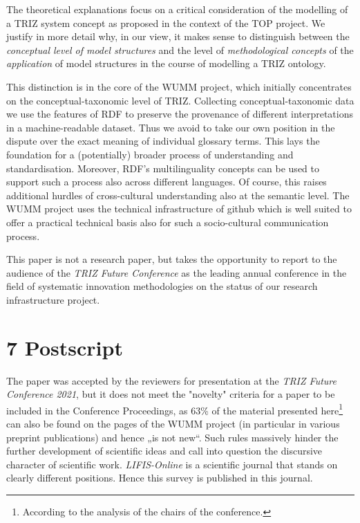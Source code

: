 \documentclass[12pt,a4paper]{article}
\begin{document}
The theoretical explanations focus on a critical consideration of the
modelling of a TRIZ system concept as proposed in the context of the TOP
project. We justify in more detail why, in our view, it makes sense to
distinguish between the \emph{conceptual level of model structures} and the
level of \emph{methodological concepts} of the \emph{application} of model
structures in the course of modelling a TRIZ ontology.

This distinction is in the core of the WUMM project, which initially
concentrates on the conceptual-taxonomic level of TRIZ. Collecting
conceptual-taxonomic data we use the features of RDF to preserve the
provenance of different interpretations in a machine-readable dataset. Thus we
avoid to take our own position in the dispute over the exact meaning of
individual glossary terms. This lays the foundation for a (potentially)
broader process of understanding and standardisation. Moreover, RDF's
multilinguality concepts can be used to support such a process also across
different languages. Of course, this raises additional hurdles of
cross-cultural understanding also at the semantic level. The WUMM project uses
the technical infrastructure of github which is well suited to offer a
practical technical basis also for such a socio-cultural communication
process.

This paper is not a research paper, but takes the opportunity to report to the
audience of the \emph{TRIZ Future Conference} as the leading annual conference
in the field of systematic innovation methodologies on the status of our
research infrastructure project.  

\section*{7 Postscript}

The paper was accepted by the reviewers for presentation at the \emph{TRIZ
  Future Conference 2021}, but it does not meet the "novelty" criteria for a
paper to be included in the Conference Proceedings, as 63\% of the material
presented here\footnote{According to the analysis of the chairs of the
  conference.} can also be found on the pages of the WUMM project (in
particular in various preprint publications) and hence „is not new“.  Such
rules massively hinder the further development of scientific ideas and call
into question the discursive character of scientific work. \emph{LIFIS-Online}
is a scientific journal that stands on clearly different positions. Hence this
survey is published in this journal.
\end{document}
